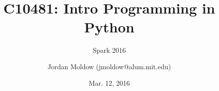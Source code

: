 \usepackage[english]{babel}

\usepackage[latin1]{inputenc}

\usepackage{times}
\usepackage[T1]{fontenc}
\usepackage{amsmath,amssymb,amsfonts}

\usepackage{textcomp, inputenc}
\renewcommand{\ttdefault}{pcr}

\renewcommand{\subject}{C10481: Intro Programming in Python}
\title %
{\subject}


\subtitle
{%
  Spark 2016%
}

\author %
{Jordan Moldow ({\ttfamily jmoldow@alum.mit.edu})
}


\date %
{Mar. 12, 2016}













\maketitle
\begin{frame}
  \titlepage
\end{frame}

